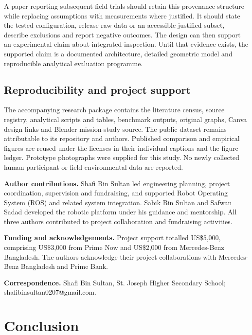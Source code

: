 \documentclass[11pt,a4paper]{article}
\begin{document}
A paper reporting subsequent field trials should retain this provenance structure while replacing assumptions with measurements where justified. It should state the tested configuration, release raw data or an accessible justified subset, describe exclusions and report negative outcomes. The design can then support an experimental claim about integrated inspection. Until that evidence exists, the supported claim is a documented architecture, detailed geometric model and reproducible analytical evaluation programme.

\FloatBarrier

\subsection{Reproducibility and project support}\label{sec:11.6}

The accompanying research package contains the literature census, source registry, analytical scripts and tables, benchmark outputs, original graphs, Canva design links and Blender mission-study source. The public dataset remains attributable to its repository and authors. Published comparison and empirical figures are reused under the licenses in their individual captions and the figure ledger. Prototype photographs were supplied for this study. No newly collected human-participant or field environmental data are reported.

\textbf{Author contributions.} Shafi Bin Sultan led engineering planning, project coordination, supervision and fundraising, and supported Robot Operating System (ROS) and related system integration. Sabik Bin Sultan and Safwan Sadad developed the robotic platform under his guidance and mentorship. All three authors contributed to project collaboration and fundraising activities.

\textbf{Funding and acknowledgements.} Project support totalled US\$5,000, comprising US\$3,000 from Prime Now and US\$2,000 from Mercedes-Benz Bangladesh. The authors acknowledge their project collaborations with Mercedes-Benz Bangladesh and Prime Bank.

\textbf{Correspondence.} Shafi Bin Sultan, St. Joseph Higher Secondary School; shafibinsultan0207@gmail.com.

\FloatBarrier

\section{Conclusion}\label{sec:12}
\end{document}
